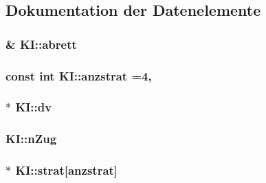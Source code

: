 \subsection{Dokumentation der Datenelemente}
\hypertarget{class_k_i_a93f7368fa6746ddb1e51d804ddaea096}{}
\subsubsection[{abrett}]{\& K\+I\+::abrett\hspace{0.3cm}{\ttfamily [private]}}\label{class_k_i_a93f7368fa6746ddb1e51d804ddaea096}
\hypertarget{class_k_i_a16d7b067120b9b638781d5e5e6dcc005}{}
\subsubsection[{anzstrat}]{\setlength{\rightskip}{0pt plus 5cm}const int K\+I\+::anzstrat =4\hspace{0.3cm}{\ttfamily [static]}, {\ttfamily [private]}}\label{class_k_i_a16d7b067120b9b638781d5e5e6dcc005}
\hypertarget{class_k_i_a34cb945060f752556a068ccf1771c531}{}
\subsubsection[{dv}]{$\ast$ K\+I\+::dv\hspace{0.3cm}{\ttfamily [private]}}\label{class_k_i_a34cb945060f752556a068ccf1771c531}
\hypertarget{class_k_i_acfefb24fdddb36cbfe2dff9e1d5d8296}{}
\subsubsection[{n\+Zug}]{ K\+I\+::n\+Zug\hspace{0.3cm}{\ttfamily [private]}}\label{class_k_i_acfefb24fdddb36cbfe2dff9e1d5d8296}
\hypertarget{class_k_i_a6e07007b67f0a2778de3148ed5612921}{}
\subsubsection[{strat}]{$\ast$ K\+I\+::strat\mbox{[}{\bf anzstrat}\mbox{]}\hspace{0.3cm}{\ttfamily [private]}}\label{class_k_i_a6e07007b67f0a2778de3148ed5612921}
\hypertarget{class_k_i_a611b37548d94d9dce7e68024aa943733}{}
